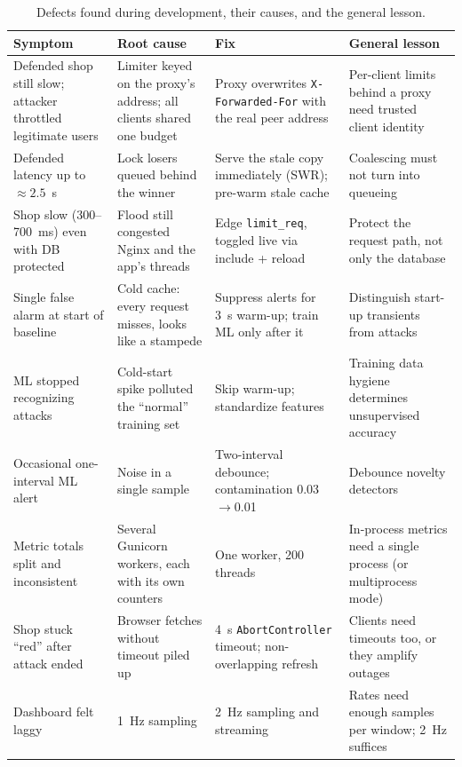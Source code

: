 \documentclass[preprint,12pt]{elsarticle}
\begin{document}
\begin{table}[t]
\centering
\caption{Defects found during development, their causes, and the general lesson.}
\label{tab:bugs}
\footnotesize
\begin{tabularx}{\linewidth}{@{}L{2.9cm}L{3.3cm}L{3.3cm}Y@{}}
\toprule
Symptom & Root cause & Fix & General lesson \\
\midrule
Defended shop still slow; attacker throttled legitimate users & Limiter keyed on the proxy's address; all clients shared one budget & Proxy overwrites \texttt{X-Forwarded-For} with the real peer address & Per-client limits behind a proxy need trusted client identity \\
Defended latency up to ${\approx}2.5$~s & Lock losers queued behind the winner & Serve the stale copy immediately (SWR); pre-warm stale cache & Coalescing must not turn into queueing \\
Shop slow (300--700~ms) even with DB protected & Flood still congested Nginx and the app's threads & Edge \texttt{limit\_req}, toggled live via include + reload & Protect the request path, not only the database \\
Single false alarm at start of baseline & Cold cache: every request misses, looks like a stampede & Suppress alerts for 3~s warm-up; train ML only after it & Distinguish start-up transients from attacks \\
ML stopped recognizing attacks & Cold-start spike polluted the ``normal'' training set & Skip warm-up; standardize features & Training data hygiene determines unsupervised accuracy \\
Occasional one-interval ML alert & Noise in a single sample & Two-interval debounce; contamination 0.03$\rightarrow$0.01 & Debounce novelty detectors \\
Metric totals split and inconsistent & Several Gunicorn workers, each with its own counters & One worker, 200 threads & In-process metrics need a single process (or multiprocess mode) \\
Shop stuck ``red'' after attack ended & Browser fetches without timeout piled up & 4~s \texttt{AbortController} timeout; non-overlapping refresh & Clients need timeouts too, or they amplify outages \\
Dashboard felt laggy & 1~Hz sampling & 2~Hz sampling and streaming & Rates need enough samples per window; 2~Hz suffices \\
\bottomrule
\end{tabularx}
\end{table}
\end{document}
